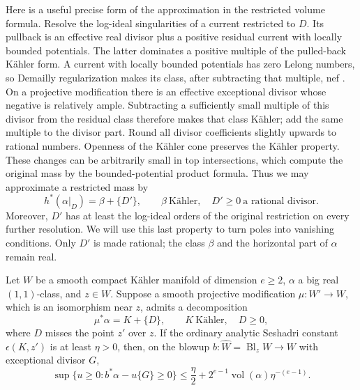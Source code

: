 Here is a useful precise form of the approximation in the restricted
volume formula.  Resolve the log-ideal singularities of a current
restricted to \(D\).  Its pullback is an effective real divisor plus a
positive residual current with locally bounded potentials.  The latter
dominates a positive multiple of the pulled-back Kähler form.  A current
with locally bounded potentials has zero Lelong numbers, so Demailly
regularization makes its class, after subtracting that multiple, nef
\cite[Theorem~1.1]{DemaillyRegularization1992}.
On a projective modification there is an effective exceptional divisor
whose negative is relatively ample.  Subtracting a sufficiently small
multiple of this divisor from the residual class therefore makes that
class Kähler; add the same multiple to the divisor part.  Round all
divisor coefficients slightly upwards to rational numbers.  Openness of
the Kähler cone preserves the Kähler property.  These changes can be
arbitrarily small in top intersections, which compute the original mass
by the bounded-potential product formula.  Thus we may approximate a
restricted mass by
\begin{equation}\label{zero:rational-fujita}
 h^*(\alpha|_D)=\beta+\{D'\},\qquad
 \beta\ \text{Kähler},\quad D'\ge0\ \text{a rational divisor}.
\end{equation}
Moreover, \(D'\) has at least the log-ideal orders of the original
restriction on every further resolution.  We will use this last
property to turn poles into vanishing conditions.  Only \(D'\) is made
rational; the class \(\beta\) and the horizontal part of \(\alpha\) remain
real.

\begin{lemma}\label{zero:pole-threshold}
Let \(W\) be a smooth compact Kähler manifold of dimension \(e\ge2\),
\(\alpha\) a big real \((1,1)\)-class, and \(z\in W\).  Suppose a smooth
projective modification \(\mu:W'\to W\), which is an isomorphism near
\(z\), admits a decomposition
\[
 \mu^*\alpha=K+\{D\},\qquad K\ \text{Kähler},\quad D\ge0,
\]
where \(D\) misses the point \(z'\) over \(z\).  If the ordinary analytic
Seshadri constant \(\epsilon(K,z')\) is at least \(\eta>0\), then, on the
blowup \(b:\widehat W=\operatorname{Bl}_zW\to W\) with exceptional divisor \(G\),
\begin{equation}\label{zero:pole-formula}
 \sup\{u\ge0:b^*\alpha-u\{G\}\ge0\}
 \le \frac{\eta}{2}
     +2^{e-1}\operatorname{vol}(\alpha)\eta^{-(e-1)} .
\end{equation}
\end{lemma}

